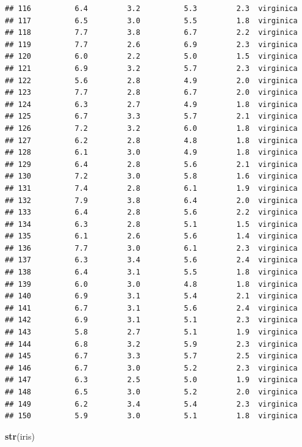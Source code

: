 \documentclass[
]{article}
\newenvironment{Shaded}{\begin{snugshade}}{\end{snugshade}}
\newcommand{\FunctionTok}[1]{\textcolor[rgb]{0.13,0.29,0.53}{\textbf{#1}}}
\newcommand{\NormalTok}[1]{#1}
\begin{document}
\begin{verbatim}
## 116          6.4         3.2          5.3         2.3  virginica
## 117          6.5         3.0          5.5         1.8  virginica
## 118          7.7         3.8          6.7         2.2  virginica
## 119          7.7         2.6          6.9         2.3  virginica
## 120          6.0         2.2          5.0         1.5  virginica
## 121          6.9         3.2          5.7         2.3  virginica
## 122          5.6         2.8          4.9         2.0  virginica
## 123          7.7         2.8          6.7         2.0  virginica
## 124          6.3         2.7          4.9         1.8  virginica
## 125          6.7         3.3          5.7         2.1  virginica
## 126          7.2         3.2          6.0         1.8  virginica
## 127          6.2         2.8          4.8         1.8  virginica
## 128          6.1         3.0          4.9         1.8  virginica
## 129          6.4         2.8          5.6         2.1  virginica
## 130          7.2         3.0          5.8         1.6  virginica
## 131          7.4         2.8          6.1         1.9  virginica
## 132          7.9         3.8          6.4         2.0  virginica
## 133          6.4         2.8          5.6         2.2  virginica
## 134          6.3         2.8          5.1         1.5  virginica
## 135          6.1         2.6          5.6         1.4  virginica
## 136          7.7         3.0          6.1         2.3  virginica
## 137          6.3         3.4          5.6         2.4  virginica
## 138          6.4         3.1          5.5         1.8  virginica
## 139          6.0         3.0          4.8         1.8  virginica
## 140          6.9         3.1          5.4         2.1  virginica
## 141          6.7         3.1          5.6         2.4  virginica
## 142          6.9         3.1          5.1         2.3  virginica
## 143          5.8         2.7          5.1         1.9  virginica
## 144          6.8         3.2          5.9         2.3  virginica
## 145          6.7         3.3          5.7         2.5  virginica
## 146          6.7         3.0          5.2         2.3  virginica
## 147          6.3         2.5          5.0         1.9  virginica
## 148          6.5         3.0          5.2         2.0  virginica
## 149          6.2         3.4          5.4         2.3  virginica
## 150          5.9         3.0          5.1         1.8  virginica
\end{verbatim}

\begin{Shaded}
\begin{Highlighting}[]
\FunctionTok{str}\NormalTok{(iris)}
\end{Highlighting}
\end{Shaded}
\end{document}
